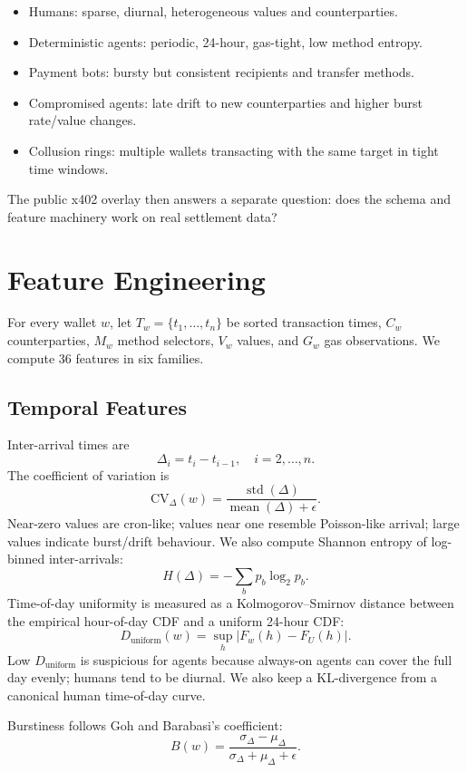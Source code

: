 \documentclass[11pt]{article}
\begin{document}
\begin{itemize}
  \item Humans: sparse, diurnal, heterogeneous values and counterparties.
  \item Deterministic agents: periodic, 24-hour, gas-tight, low method entropy.
  \item Payment bots: bursty but consistent recipients and transfer methods.
  \item Compromised agents: late drift to new counterparties and higher burst
        rate/value changes.
  \item Collusion rings: multiple wallets transacting with the same target in
        tight time windows.
\end{itemize}

The public x402 overlay then answers a separate question: does the schema and
feature machinery work on real settlement data?

\section{Feature Engineering}

For every wallet \(w\), let \(T_w=\{t_1,\ldots,t_n\}\) be sorted transaction
times, \(C_w\) counterparties, \(M_w\) method selectors, \(V_w\) values, and
\(G_w\) gas observations.  We compute 36 features in six families.

\subsection{Temporal Features}

Inter-arrival times are
\[
  \Delta_i = t_i - t_{i-1}, \quad i=2,\ldots,n.
\]
The coefficient of variation is
\[
  \mathrm{CV}_\Delta(w)=
  \frac{\operatorname{std}(\Delta)}{\operatorname{mean}(\Delta)+\epsilon}.
\]
Near-zero values are cron-like; values near one resemble Poisson-like
arrival; large values indicate burst/drift behaviour.  We also compute
Shannon entropy of log-binned inter-arrivals:
\[
  H(\Delta)=-\sum_b p_b \log_2 p_b.
\]
Time-of-day uniformity is measured as a Kolmogorov--Smirnov distance between
the empirical hour-of-day CDF and a uniform 24-hour CDF:
\[
  D_{\mathrm{uniform}}(w)=\sup_h |F_w(h)-F_U(h)|.
\]
Low \(D_{\mathrm{uniform}}\) is suspicious for agents because always-on agents
can cover the full day evenly; humans tend to be diurnal.  We also keep a
KL-divergence from a canonical human time-of-day curve.

Burstiness follows Goh and Barabasi's coefficient:
\[
  B(w)=\frac{\sigma_\Delta-\mu_\Delta}{\sigma_\Delta+\mu_\Delta+\epsilon}.
\]
\end{document}
